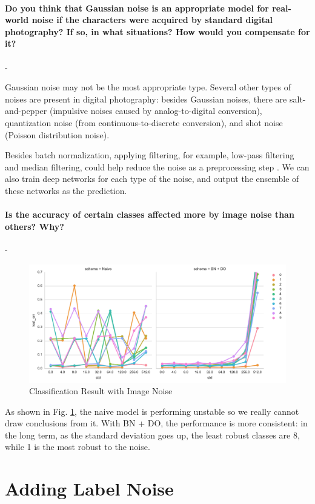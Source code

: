 \documentclass[11pt]{article}
\begin{document}
\paragraph{Do you think that Gaussian noise is an appropriate model for real-world noise if the characters were acquired by standard digital photography? If so, in what situations? How would you compensate for it?} -

Gaussian noise may not be the most appropriate type. Several other types of noises are present in digital photography: besides Gaussian noises, there are salt-and-pepper (impulsive noises caused by analog-to-digital conversion), quantization noise (from continuous-to-discrete conversion), and shot noise (Poisson distribution noise). 

Besides batch normalization, applying filtering, for example, low-pass filtering and median filtering, could help reduce the noise as a preprocessing step \cite{kaur2015noise}. We can also train deep networks for each type of the noise, and output the ensemble of these networks as the prediction.

\paragraph{Is the accuracy of certain classes affected more by image noise than others? Why?} -
\begin{figure}[H]
    \includegraphics[width=.9\textwidth]{Figs/exp2_2}
    \caption{Classification Result with Image Noise}\label{fig:exp22}
\end{figure}
As shown in Fig. \ref{fig:exp22}, the naive model is performing unstable so we really cannot draw conclusions from it. With BN + DO, the performance is more consistent: in the long term, as the standard deviation goes up, the least robust classes are 8, while 1 is the most robust to the noise.

\section{Adding Label Noise}
\end{document}
